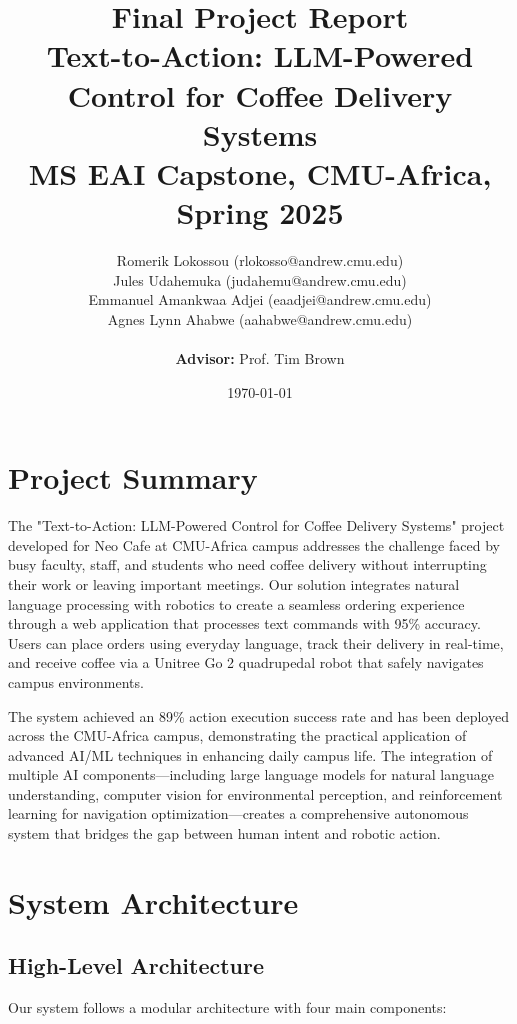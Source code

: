\documentclass[12pt]{article}
\title{Final Project Report\\
\Large Text-to-Action: LLM-Powered Control for Coffee Delivery Systems\\
\normalsize MS EAI Capstone, CMU-Africa, Spring 2025}
\author{
Romerik Lokossou (rlokosso@andrew.cmu.edu)\\
Jules Udahemuka (judahemu@andrew.cmu.edu)\\
Emmanuel Amankwaa Adjei (eaadjei@andrew.cmu.edu)\\
Agnes Lynn Ahabwe (aahabwe@andrew.cmu.edu)\\
\\
\textbf{Advisor:} Prof. Tim Brown
}
\date{\today}
\begin{document}
\maketitle
\newpage

\section{Project Summary}

The "Text-to-Action: LLM-Powered Control for Coffee Delivery Systems" project developed for Neo Cafe at CMU-Africa campus addresses the challenge faced by busy faculty, staff, and students who need coffee delivery without interrupting their work or leaving important meetings. Our solution integrates natural language processing with robotics to create a seamless ordering experience through a web application that processes text commands with 95\% accuracy. Users can place orders using everyday language, track their delivery in real-time, and receive coffee via a Unitree Go 2 quadrupedal robot that safely navigates campus environments. 

The system achieved an 89\% action execution success rate and has been deployed across the CMU-Africa campus, demonstrating the practical application of advanced AI/ML techniques in enhancing daily campus life. The integration of multiple AI components—including large language models for natural language understanding, computer vision for environmental perception, and reinforcement learning for navigation optimization—creates a comprehensive autonomous system that bridges the gap between human intent and robotic action.

\section{System Architecture}

\subsection{High-Level Architecture}

Our system follows a modular architecture with four main components:
\end{document}
